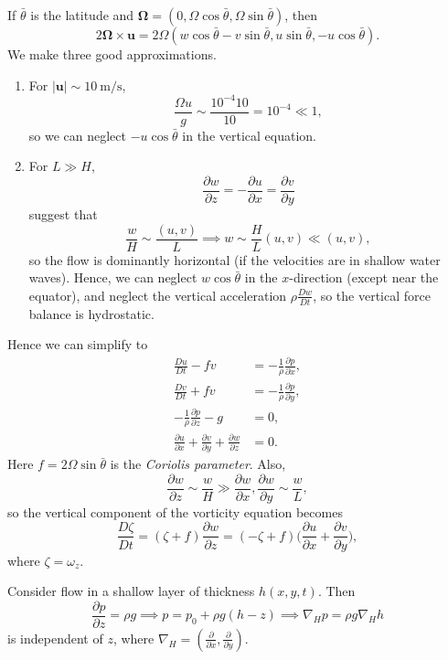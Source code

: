 \documentclass[12pt]{article}
\begin{document}
If $\bar \theta$ is the latitude and $\bm{\Omega} = (0, \Omega \cos \bar \theta, \Omega \sin \bar \theta)$, then
\[
2 \bm{\Omega} \times \mathbf{u} = 2 \Omega (w \cos \bar \theta - v \sin \bar \theta, u \sin \bar \theta, - u \cos \bar \theta).
\]
We make three good approximations.
\begin{enumerate}
	\item For $|\mathbf{u}| \sim \qty{10}{\metre \per \second}$,
		\[
		\frac{\Omega u}{g} \sim \frac{10^{-4} 10}{10} = 10^{-4} \ll 1,
		\]
		so we can neglect $- u \cos \bar \theta$ in the vertical equation.
	\item For $L \gg H$,
		\[
		\frac{\partial w}{\partial z} = - \frac{\partial u}{\partial x} = \frac{\partial v}{\partial y}
		\]
		suggest that
		\[
		\frac{w}{H} \sim \frac{(u, v)}{L} \implies w \sim \frac{H}{L}(u, v) \ll (u, v),
		\]
		so the flow is dominantly horizontal (if the velocities are in shallow water waves). Hence, we can neglect $w \cos \bar \theta$ in the $x$-direction (except near the equator), and neglect the vertical acceleration $\rho \frac{D w}{D t}$, so the vertical force balance is hydrostatic.
\end{enumerate}
Hence we can simplify to
\begin{align*}
	\frac{Du}{Dt} - fv &= - \frac{1}{\rho} \frac{\partial p}{\partial x}, \\
	\frac{Dv}{Dt} + fv &= - \frac{1}{\rho} \frac{\partial p}{\partial y}, \\
	- \frac{1}{\rho} \frac{\partial p}{\partial z} - g &= 0, \\
	\frac{\partial u}{\partial x} + \frac{\partial v}{\partial y} + \frac{\partial w}{\partial z} &= 0.
\end{align*}
Here $f = 2 \Omega \sin \bar \theta$ is the \emph{Coriolis parameter}. Also,
\[
\frac{\partial w}{\partial z} \sim \frac{w}{H} \gg \frac{\partial w}{\partial x}, \frac{\partial w}{\partial y} \sim \frac{w}{L},
\]
so the vertical component of the vorticity equation becomes
\[
	\frac{D \zeta}{D t} = (\zeta + f) \frac{\partial w}{\partial z} = (- \zeta + f)\biggl( \frac{\partial u}{\partial x} + \frac{\partial v}{\partial y} \biggr),
\]
where $\zeta = \omega_z$.

Consider flow in a shallow layer of thickness $h(x, y, t)$. Then
\[
\frac{\partial p}{\partial z} = \rho g \implies p = p_0 + \rho g(h - z) \implies \nabla_H p = \rho g \nabla_H h
\]
is independent of $z$, where $\nabla_H = ( \frac{\partial}{\partial x}, \frac{\partial}{\partial y} )$.

\newpage

\printindex
\end{document}
